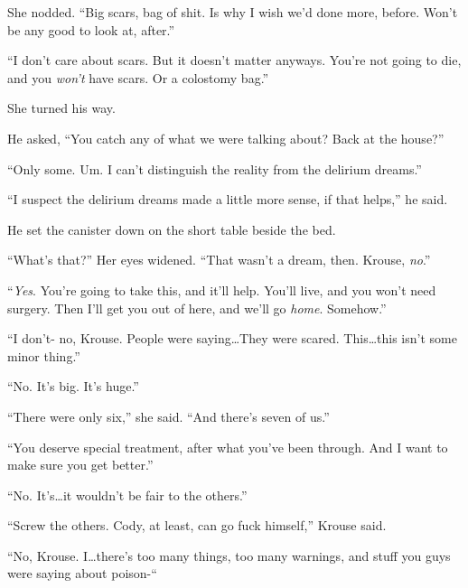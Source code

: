 She nodded.  ``Big scars, bag of shit.  Is why I wish we'd done more, before.  Won't be any good to look at, after.''



``I don't care about scars.  But it doesn't matter anyways.  You're not going to die, and you \emph{won't} have scars.  Or a colostomy bag.''



She turned his way.



He asked, ``You catch any of what we were talking about?  Back at the house?''



``Only some.  Um.  I can't distinguish the reality from the delirium dreams.''



``I suspect the delirium dreams made a little more sense, if that helps,'' he said.



He set the canister down on the short table beside the bed.



``What's that?''  Her eyes widened.  ``That wasn't a dream, then.  Krouse, \emph{no}.''



``\emph{Yes}.  You're going to take this, and it'll help.  You'll live, and you won't need surgery.  Then I'll get you out of here, and we'll go \emph{home}.  Somehow.''



``I don't- no, Krouse.  People were saying\ldots  They were scared.  This\ldots this isn't some minor thing.''



``No.  It's big.  It's huge.''



``There were only six,'' she said.  ``And there's seven of us.''



``You deserve special treatment, after what you've been through.  And I want to make sure you get better.''



``No.  It's\ldots it wouldn't be fair to the others.''



``Screw the others.  Cody, at least, can go fuck himself,'' Krouse said.



``No, Krouse.  I\ldots there's too many things, too many warnings, and stuff you guys were saying about poison-``



